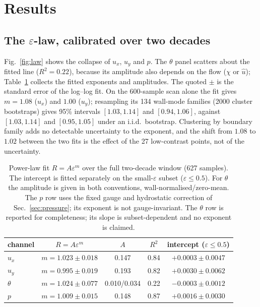 \documentclass[preprint,11pt,a4paper,times,doubleblind]{elsarticle}
\begin{document}
\section{Results}
\label{sec:results}

\subsection{The $\varepsilon$-law, calibrated over two decades}
\label{sec:law}

Fig.~\ref{fig:law} shows the collapse of $u_x$, $u_y$ and $p$. The $\theta$ panel scatters about
the fitted line ($R^2=0.22$), because its amplitude also depends on the flow ($\chi$ or $\hat u$);
Table~\ref{tab:law} collects the fitted exponents and amplitudes. The quoted $\pm$ is the standard
error of the log--log fit. On the 600-sample scan alone the fit gives $m=1.08$ ($u_x$) and $1.00$
($u_y$); resampling its 134 wall-mode families (2000 cluster bootstraps) gives 95\% intervals
$[1.03,1.14]$ and $[0.94,1.06]$, against $[1.03,1.14]$ and $[0.95,1.05]$ under an i.i.d.\ bootstrap.
Clustering by boundary family adds no detectable uncertainty to the exponent, and the shift from
$1.08$ to $1.02$ between the two fits is the effect of the 27 low-contrast points, not of the
uncertainty.

\begin{table}[htbp]
\centering
\small
\caption{Power-law fit $R=A\varepsilon^m$ over the full two-decade window (627 samples). The
intercept is fitted separately on the small-$\varepsilon$ subset ($\varepsilon\le0.5$). For $\theta$
the amplitude is given in both conventions, wall-normalised/zero-mean. The $p$ row uses the fixed
gauge and hydrostatic correction of Sec.~\ref{sec:pressure}; its exponent is not gauge-invariant.
The $\theta$ row is reported for completeness; its slope is subset-dependent and no exponent is
claimed.}
\label{tab:law}
\begin{tabular}{@{}lcccc@{}}
\toprule
channel & $R=A\varepsilon^m$ & $A$ & $R^2$ & intercept ($\varepsilon\le0.5$)\\
\midrule
$u_x$ & $m=1.023\pm0.018$ & 0.147 & 0.84 & $+0.0003\pm0.0047$\\
$u_y$ & $m=0.995\pm0.019$ & 0.193 & 0.82 & $+0.0030\pm0.0062$\\
$\theta$ & $m=1.024\pm0.077$ & 0.010/0.034 & 0.22 & $-0.0003\pm0.0012$\\
$p$ & $m=1.009\pm0.015$ & 0.148 & 0.87 & $+0.0016\pm0.0030$\\
\bottomrule
\end{tabular}
\end{table}
\end{document}
